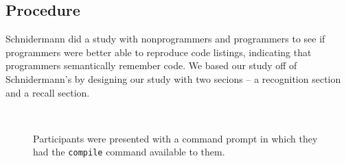 \documentclass[conference]{IEEEtran}
\begin{document}



\subsection{Procedure}

Schnidermann did a study with nonprogrammers and programmers to see if programmers were better able to reproduce code listings, indicating that programmers semantically remember code.  We based our study off of Schnidermann's by designing our study with two secions -- a recognition section and a recall section.

\begin{figure}[!t]
  \centering  
  \\
  \caption{Participants were presented with a command prompt in which they had the \texttt{compile} command available to them.\label{fig:progenv}}
\end{figure}
\end{document}
